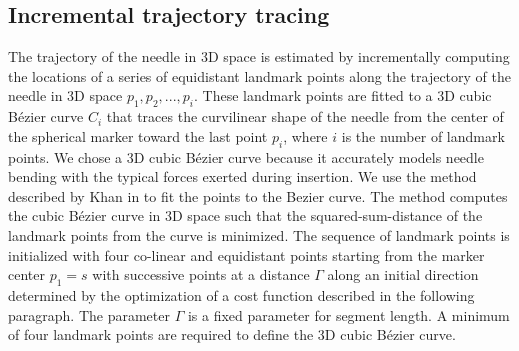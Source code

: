 \subsection*{\textbf{Incremental trajectory tracing}} \label{inctracing}

The trajectory of the needle in 3D space is estimated by incrementally computing the locations of a series of equidistant landmark points along the trajectory of the needle in 3D space $p_1, p_2, ..., p_i$. These landmark points are fitted to a 3D cubic B\'ezier curve $C_i$  that traces the curvilinear shape of the needle from the center of the spherical marker toward the last point $p_i$, where $i$ is the number of landmark points. We chose a 3D cubic B\'ezier curve because it accurately models needle bending with the typical forces exerted during insertion. We use the method described by Khan in \cite{khan2007approximation} to fit the points to the Bezier curve. The method computes the cubic B\'ezier curve in 3D space such that the squared-sum-distance of the landmark points from the curve is minimized. The sequence of landmark points is initialized with four co-linear and equidistant points starting from the marker center $p_1=s$ with successive points at a distance $\Gamma$ along an initial direction determined by the optimization of a cost function described in the following paragraph. The  parameter  $\Gamma$ is a fixed parameter for segment length. A minimum of four landmark points are required to define the 3D cubic B\'ezier curve. 


